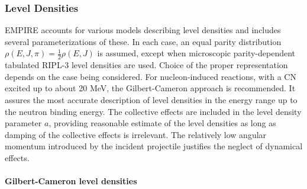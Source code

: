 \subsubsection{Level Densities}

EMPIRE accounts for various models describing level densities%
 and includes several parameterizations of these. In
each case, an equal parity distribution $\rho (E,J,\pi )=%
\frac{1}{2}\rho (E,J)$ is assumed, except when microscopic parity-dependent
tabulated RIPL-3 level densities are used. Choice of the proper
representation depends on the case being considered. For nucleon-induced
reactions, with a CN excited up to about 20 MeV, the Gilbert-Cameron approach
is recommended. It assures the most accurate description of level densities
in the energy range up to the neutron binding energy. The collective effects
are included in the level density parameter $a$, providing reasonable
estimate of the level densities as long as damping of the collective effects
is irrelevant. The relatively low angular momentum introduced by the
incident projectile justifies the neglect of dynamical effects.

\medskip

\paragraph{Gilbert-Cameron level densities}

